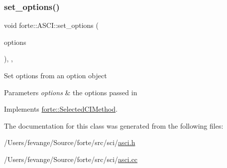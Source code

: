 \subsubsection{\texorpdfstring{set\+\_\+options()}{set\_options()}}
{\footnotesize\ttfamily void forte\+::\+A\+S\+C\+I\+::set\+\_\+options (\begin{DoxyParamCaption}\item[{std\+::shared\+\_\+ptr$<$ \mbox{\hyperlink{classforte_1_1_forte_options}{Forte\+Options}} $>$}]{options }\end{DoxyParamCaption})\hspace{0.3cm}{\ttfamily [inline]}, {\ttfamily [override]}, {\ttfamily [virtual]}}

Set options from an option object 
\begin{DoxyParams}{Parameters}
{\em options} & the options passed in \\
\hline
\end{DoxyParams}


Implements \mbox{\hyperlink{classforte_1_1_selected_c_i_method_ad03bbde3a0443ca9b01ff9605f2e06e0}{forte\+::\+Selected\+C\+I\+Method}}.



The documentation for this class was generated from the following files\+:\begin{DoxyCompactItemize}
\item 
/\+Users/fevange/\+Source/forte/src/sci/\mbox{\hyperlink{asci_8h}{asci.\+h}}\item 
/\+Users/fevange/\+Source/forte/src/sci/\mbox{\hyperlink{asci_8cc}{asci.\+cc}}\end{DoxyCompactItemize}
